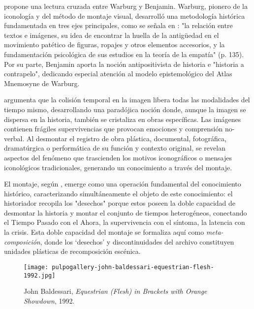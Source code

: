 \textcolor{edit30sept}{\parencite{Guasch2011} propone una lectura cruzada entre Warburg y Benjamin. Warburg, pionero de la iconología y del método de montaje visual, desarrolló una metodología histórica fundamentada en tres ejes principales}, como se señala en \parencite{Warburg2010}: "la relación entre textos e imágenes, su idea de encontrar la huella de la antigüedad en el movimiento patético de figuras, ropajes y otros elementos accesorios, y la fundamentación psicológica de sus estudios en la teoría de la empatía" (p. 135). Por su parte, Benjamin aporta la noción antipositivista de historia e "historia a contrapelo", dedicando especial atención al modelo epistemológico del Atlas Mnemosyne de Warburg.

\parencite{DidiHuberman2011} argumenta que la colisión temporal en la imagen libera todas las modalidades del tiempo mismo, desarrollando una paradójica noción donde, aunque la imagen se dispersa en la historia, también se cristaliza en obras específicas. Las imágenes contienen frágiles supervivencias que provocan emociones y comprensión no-verbal. Al desmontar el registro de obra plástica, documental, fotográfica, dramatúrgica o performática de su función y contexto original, se revelan aspectos del fenómeno que trascienden los motivos iconográficos o mensajes iconológicos tradicionales, generando un conocimiento a través del montaje.

El montaje, según \parencite{DidiHuberman2011}, emerge como una operación fundamental del conocimiento histórico, caracterizando simultáneamente el objeto de este conocimiento: el historiador recopila los "desechos" porque estos poseen la doble capacidad de desmontar la historia y montar el conjunto de tiempos heterogéneos, conectando el Tiempo Pasado con el Ahora, la supervivencia con el síntoma, la latencia con la crisis. \textcolor{edit30sept}{Esta doble capacidad del montaje se formaliza aquí como \textit{meta-composición}, donde los ‘desechos’ y discontinuidades del archivo constituyen unidades plásticas de recomposición escénica.}


\begin{figure}[ht]
    \centering
    \texttt{[image: pulpogallery-john-baldessari-equestrian-flesh-1992.jpg]}
    \caption{John Baldessari, \textit{Equestrian (Flesh) in Brackets with Orange Showdown}, 1992.}
    \label{fig:baldessari_equestrian}
\end{figure}



